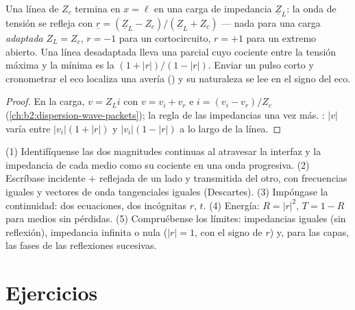 \begin{proposition}\label{prop:b2:wave-interfaces:coax}
Una línea de  $Z_c$ termina en $x = \ell$ en una carga de
impedancia $\underline Z_L$: la onda de tensión se refleja con $\underline r =
(\underline Z_L - Z_c)/(\underline Z_L + Z_c)$ --- nada para una carga \emph{adaptada}
$Z_L = Z_c$, $r = -1$ para un cortocircuito, $r = +1$ para un extremo abierto. Una
línea desadaptada lleva una  parcial cuyo cociente entre la tensión máxima
y la mínima es la \emph{} $(1 + |r|)/(1 - |r|)$.
Enviar un pulso corto y cronometrar el eco localiza una avería () y su naturaleza se lee en el signo del eco.
\end{proposition}

\begin{proof}
En la carga, $v = Z_Li$ con $v = v_i + v_r$ e $i = (v_i - v_r)/Z_c$
(\cref{ch:b2:dispersion-wave-packets}); la regla de las impedancias una vez más.
: $|v|$ varía entre $|v_i|(1 + |r|)$ y $|v_i|(1 -
|r|)$ a lo largo de la línea.
\end{proof}

\begin{method}\label{met:b2:wave-interfaces:method}
(1) Identifíquense las dos magnitudes continuas al atravesar la interfaz y
la impedancia de cada medio como su cociente en una onda progresiva.
(2) Escríbase incidente $+$ reflejada de un lado y transmitida del otro,
con frecuencias iguales y vectores de onda tangenciales iguales (Descartes).
(3) Impóngase la continuidad: dos ecuaciones, dos incógnitas $r$, $t$. (4) Energía:
$R = |r|^2$, $T = 1 - R$ para medios sin pérdidas. (5) Compruébense los límites: impedancias
iguales (sin reflexión), impedancia infinita o nula ($|r| = 1$, con el signo
de $r$) y, para las capas, las fases de las reflexiones sucesivas.
\end{method}

\section{Ejercicios}

